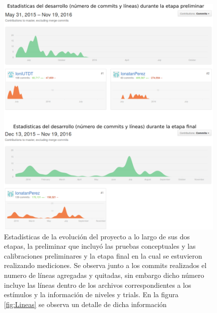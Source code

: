 \documentclass{article}
\numberwithin{figure}{section}
\begin{document}
    \begin{figure}
        \center
        \includegraphics[width=\textwidth]{Imagenes/Commits.png}
        \caption{Estadísticas de la evolución del proyecto a lo largo de sus dos etapas, la preliminar que incluyó las pruebas conceptuales y las calibraciones preliminares y la etapa final en la cual se estuvieron realizando mediciones. Se observa junto a los commits realizados el numero de líneas agregadas y quitadas, sin embargo dicho número incluye las líneas dentro de los archivos correspondientes a los estímulos y la información de niveles y trials. En la figura \ref{fig:Lineas} se observa un detalle de dicha información}
        \label{fig:Commits}
    \end{figure}
    
\end{document}

